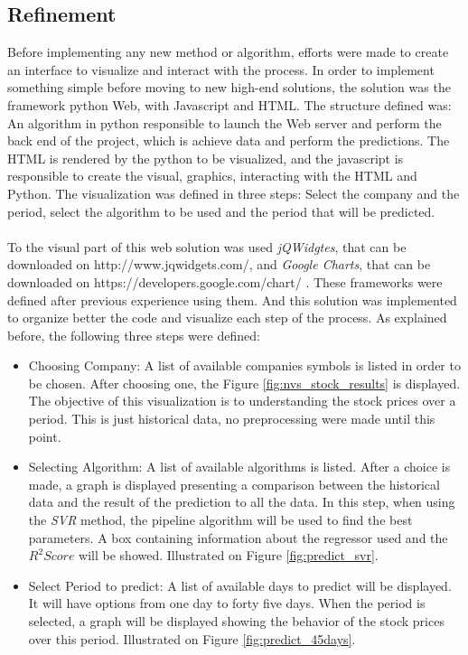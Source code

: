 \subsection{Refinement}
Before implementing any new method or algorithm, efforts were made to create an interface to visualize and interact with the process. In order to implement something simple
before moving to new high-end solutions, the solution was the framework python Web, with Javascript and HTML. The structure defined was: An algorithm in python responsible to launch the
Web server and perform the back end of the project, which is achieve data and perform the predictions. The HTML is rendered by the python to be visualized, and the javascript is responsible
to create the visual, graphics, interacting with the HTML and Python. The visualization was defined in three steps: Select the company and the period, select the algorithm to be used and the period
that will be predicted.\\
\\
To the visual part of this web solution was used \textit{jQWidgtes}, that can be downloaded on http://www.jqwidgets.com/, and \textit{Google Charts}, that can be downloaded on https://developers.google.com/chart/ .
These frameworks were defined after previous experience using them. And this solution was implemented to organize better the code and visualize each step of the process. As explained before, the
following three steps were defined:
\begin{itemize}
 \item Choosing Company: A list of available companies symbols is listed in order to be chosen. After choosing one, the Figure \ref{fig:nvs_stock_results} is displayed. The objective of this
 visualization is to understanding the stock prices over a period. This is just historical data, no preprocessing were made until this point. 
 \item Selecting Algorithm: A list of available algorithms is listed. After a choice is made, a graph is displayed presenting a comparison between the historical data and the result of the 
 prediction to all the data. In this step, when using the \textit{SVR} method, the pipeline algorithm will be used to find the best parameters. A box containing information about the regressor
 used and the $R^2 Score$ will be showed. Illustrated on Figure \ref{fig:predict_svr}.
 \item Select Period to predict: A list of available days to predict will be displayed. It will have options from one day to forty five days. When the period is selected, a graph will be displayed
 showing the behavior of the stock prices over this period. Illustrated on Figure \ref{fig:predict_45days}.
\end{itemize}